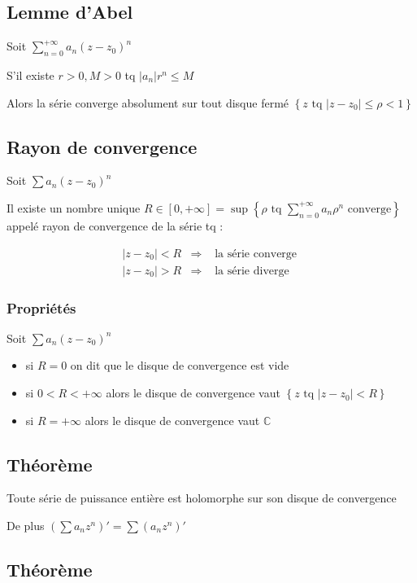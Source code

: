 \documentclass[a4paper,10pt]{report}
\newcommand{\C}{\mathbb{C}}
\newcommand{\so}{\Rightarrow}
\newcommand{\tset}[1]{\left\lbrace #1 \right\rbrace}
\newcommand{\abs}[1]{\left\vert #1 \right\vert}
\begin{document}
\subsection{Lemme d'Abel}

Soit $\sum_{n=0}^{+\infty} a_n(z-z_0)^n$

S'il existe $r > 0, M > 0$ tq $\abs{a_n} r^n \leq M$

Alors la série converge absolument sur tout disque fermé $\tset{z \mbox{ tq }
\abs{z - z_0} \leq \rho < 1}$

\subsection{Rayon de convergence}

Soit $\sum a_n(z-z_0)^n$

Il existe un nombre unique $R \in [0, +\infty] = \sup\tset{ \rho \mbox{ tq } \sum_{n=0}^{+\infty} a_n \rho^n \mbox{ converge}}$ appelé rayon de convergence de la série tq :

\[\begin{array}{ccc}
\abs{z - z_0} < R & \so & \mbox{ la série converge } \\
\abs{z - z_0} > R & \so & \mbox{ la série diverge }
\end{array}\]

\subsubsection{Propriétés}
Soit $\sum a_n(z - z_0)^n$
\begin{itemize}
  \item{si $R = 0$ on dit que le disque de convergence est vide}
  \item{si $0 < R < +\infty$ alors le disque de convergence vaut $\tset{z
    \mbox{ tq } \abs{ z - z_0} < R}$}
  \item{si $R = +\infty$ alors le disque de convergence vaut $\C$}
\end{itemize}

\subsection{Théorème}

Toute série de puissance entière est holomorphe sur son disque de convergence

De plus $\left(\sum a_n z^n\right)' = \sum \left( a_n z^n \right)'$

\subsection{Théorème}
\end{document}

